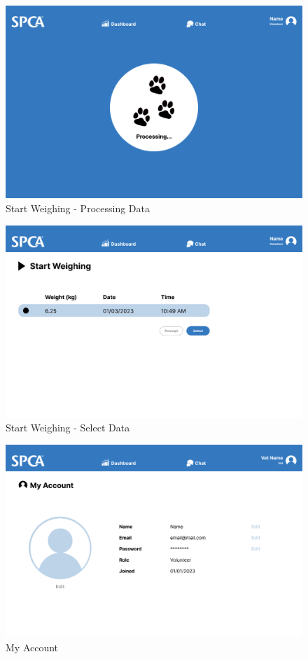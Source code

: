 \begin{figure}[h]
\centering
\includegraphics[width=\textwidth]{proposal/parts/add-data-2.png}
\caption{Start Weighing - Processing Data}
\label{figure:add data 2}
\end{figure}

\begin{figure}[h]
\centering
\includegraphics[width=\textwidth]{proposal/parts/add-data-3.png}
\caption{Start Weighing - Select Data}
\label{figure:add data 3}
\end{figure}

\begin{figure}[h]
\centering
\includegraphics[width=\textwidth]{proposal/parts/my-account.png}
\caption{My Account}
\label{figure:account}
\end{figure}

